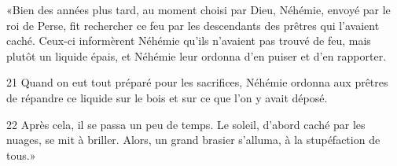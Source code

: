«Bien des années plus tard, au moment choisi par Dieu, Néhémie, envoyé par le roi de Perse, fit rechercher ce feu par les descendants des prêtres qui l’avaient caché. Ceux-ci informèrent Néhémie qu’ils n’avaient pas trouvé de feu, mais plutôt un liquide épais, et Néhémie leur ordonna d’en puiser et d’en rapporter.

21 Quand on eut tout préparé pour les sacrifices, Néhémie ordonna aux prêtres de répandre ce liquide sur le bois et sur ce que l’on y avait déposé.

22 Après cela, il se passa un peu de temps. Le soleil, d’abord caché par les nuages, se mit à briller. Alors, un grand brasier s’alluma, à la stupéfaction de tous.»

